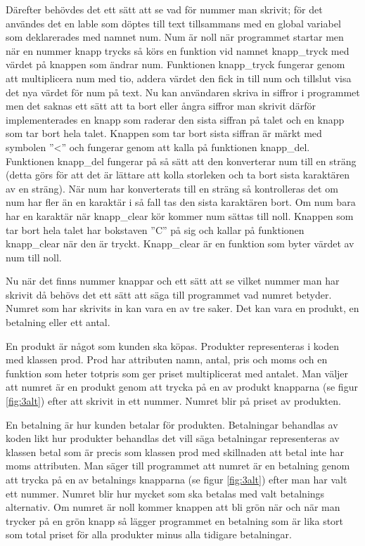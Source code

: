 \documentclass[a4paper, 12pt]{article}
\begin{document}
Därefter behövdes det ett sätt att se vad för nummer man skrivit; för det användes det en lable som döptes till text tillsammans med en global variabel som deklarerades med namnet num.
Num är noll när programmet startar men när en nummer knapp trycks så körs en funktion vid namnet knapp\_tryck med värdet på knappen som ändrar num. Funktionen knapp\_tryck fungerar genom att multiplicera num med tio, addera värdet den fick in till num och tillslut visa det nya värdet för num på text. 
Nu kan användaren skriva in siffror i programmet men det saknas ett sätt att ta bort eller ångra siffror man skrivit därför implementerades en knapp som raderar den sista siffran på talet och en knapp som tar bort hela talet.
Knappen som tar bort sista siffran är märkt med symbolen ''\textless'' och fungerar genom att kalla på funktionen knapp\_del. Funktionen knapp\_del fungerar på så sätt att den konverterar num till en sträng (detta görs för att det är lättare att kolla storleken och ta bort sista karaktären av en sträng). 
När num har konverterats till en sträng så kontrolleras det om num har fler än en karaktär i så fall tas den sista karaktären bort. Om num bara har en karaktär när knapp\_clear kör kommer num sättas till noll.
Knappen som tar bort hela talet har bokstaven ''C'' på sig och kallar på funktionen knapp\_clear när den är tryckt. Knapp\_clear är en funktion som byter värdet av num till noll.


Nu när det finns nummer knappar och ett sätt att se vilket nummer man har skrivit då behövs det ett sätt att säga till programmet vad numret betyder. Numret som har skrivits in kan vara en av tre saker. 
Det kan vara en produkt, en betalning eller ett antal.

En produkt är något som kunden ska köpas. Produkter representeras i koden med klassen prod. Prod har attributen namn, antal, pris och moms och en funktion som heter totpris som ger priset multiplicerat med antalet. 
Man väljer att numret är en produkt genom att trycka på en av produkt knapparna (se figur \ref{fig:3alt}) efter att skrivit in ett nummer. Numret blir på priset av produkten.


En betalning är hur kunden betalar för produkten. Betalningar behandlas av koden likt hur produkter behandlas det vill säga
betalningar representeras av klassen betal som är precis som klassen prod med skillnaden att betal inte har moms attributen. Man säger till programmet att numret är en betalning genom att trycka på en av betalnings knapparna (se figur \ref{fig:3alt}) efter man har valt ett nummer. Numret blir hur mycket som ska betalas med valt betalnings alternativ. Om numret är noll kommer knappen att bli grön när och när man trycker på en grön knapp så lägger programmet en betalning som är lika stort som total priset för alla produkter minus alla tidigare betalningar.
\end{document}
